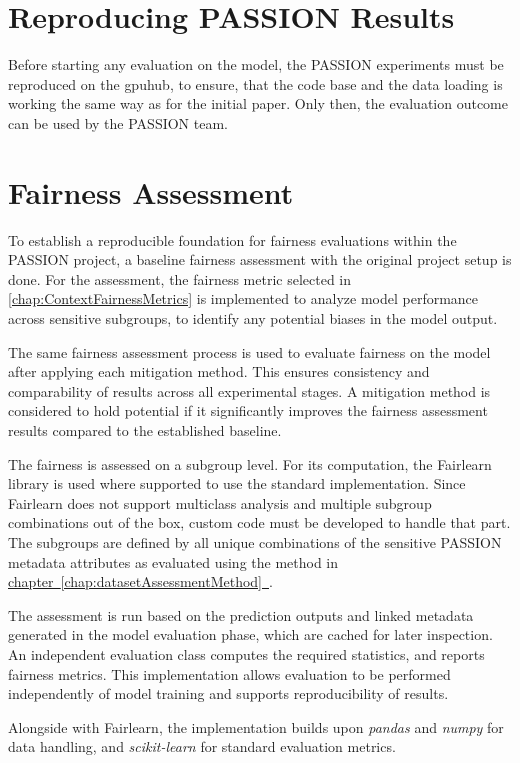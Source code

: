 \documentclass[12pt, a4paper, oneside]{book}   	%
\newcommand{\linkchap}[1]{\hyperref[#1]{chapter~\ref{#1}~\nameref{#1}}}
\begin{document}
		\section{Reproducing PASSION Results}
		Before starting any evaluation on the model, the PASSION experiments must be reproduced on the \gls{gpuhub}, to ensure, that the code base and the data loading is working the same way as for the initial paper. Only then, the evaluation outcome can be used by the PASSION team.
		
				
		\section{Fairness Assessment}\label{chap:fairnessAssessmentMethod}
		To establish a reproducible foundation for fairness evaluations within the PASSION project, a baseline fairness assessment with the original project setup is done. For the assessment, the fairness metric selected in \autoref{chap:ContextFairnessMetrics} is implemented to analyze model performance across sensitive subgroups, to identify any potential biases in the model output.
		
		The same fairness assessment process is used to evaluate fairness on the model after applying each mitigation method. This ensures consistency and comparability of results across all experimental stages. A mitigation method is considered to hold potential if it significantly improves the fairness assessment results compared to the established baseline.
		
		The fairness is assessed on a subgroup level. For its computation, the \gls{Fairlearn} library is used where supported to use the standard implementation. Since \gls{Fairlearn} does not support multiclass analysis and multiple subgroup combinations out of the box, custom code must be developed to handle that part.
		The subgroups are defined by all unique combinations of the sensitive PASSION metadata attributes as evaluated using the method in \linkchap{chap:datasetAssessmentMethod}.
		
		The assessment is run based on the prediction outputs and linked metadata generated in the model evaluation phase, which are cached for later inspection. An independent evaluation class computes the required statistics, and reports fairness metrics. This implementation allows evaluation to be performed independently of model training and supports reproducibility of results.
		
		Alongside with \gls{Fairlearn}, the implementation builds upon \textit{pandas} and \textit{numpy} for data handling, and \textit{scikit-learn} for standard evaluation metrics.
		
\end{document}
